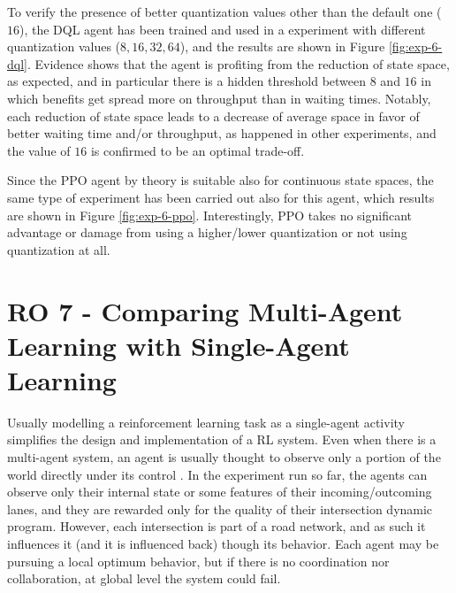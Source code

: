 To verify the presence of better quantization values other than the default one ($16$), the DQL agent has been trained and used in a experiment with different quantization values ($8, 16, 32, 64$), and the results are shown in Figure \ref{fig:exp-6-dql}.
Evidence shows that the agent is profiting from the reduction of state space, as expected, and in particular there is a hidden threshold between $8$ and $16$ in which benefits get spread more on throughput than in waiting times.
Notably, each reduction of state space leads to a decrease of average space in favor of better waiting time and/or throughput, as happened in other experiments, and the value of $16$ is confirmed to be an optimal trade-off.

Since the PPO agent by theory is suitable also for continuous state spaces, the same type of experiment has been carried out also for this agent, which results are shown in Figure \ref{fig:exp-6-ppo}.
Interestingly, PPO takes no significant advantage or damage from using a higher/lower quantization or not using quantization at all.



\section{RO 7 - Comparing Multi-Agent Learning with Single-Agent Learning}

Usually modelling a reinforcement learning task as a single-agent activity simplifies the design and implementation of a RL system.
Even when there is a multi-agent system, an agent is usually thought to observe only a portion of the world directly under its control \cite{alegre2021quantifying}.
In the experiment run so far, the agents can observe only their internal state or some features of their incoming/outcoming lanes, and they are rewarded only for the quality of their intersection dynamic program.
However, each intersection is part of a road network, and as such it influences it (and it is influenced back) though its behavior.
Each agent may be pursuing a local optimum behavior, but if there is no coordination nor collaboration, at global level the system could fail.

